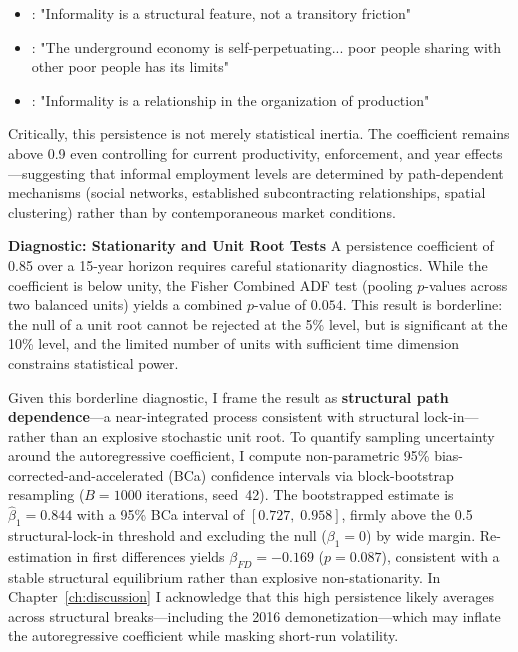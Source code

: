 \begin{itemize}
	\item \textcite{Portes1989}: "Informality is a structural feature, not a transitory friction"
	\item \textcite{Venkatesh2006}: "The underground economy is self-perpetuating... poor people sharing with other poor people has its limits"
	\item \textcite{Fortuna1989}: "Informality is a relationship in the organization of production"
\end{itemize}

Critically, this persistence is not merely statistical inertia. The coefficient remains above 0.9 even controlling for current productivity, enforcement, and year effects—suggesting that informal employment levels are determined by path-dependent mechanisms (social networks, established subcontracting relationships, spatial clustering) rather than by contemporaneous market conditions.

\noindent \textbf{Diagnostic: Stationarity and Unit Root Tests}
A persistence coefficient of 0.85 over a 15-year horizon requires careful stationarity diagnostics. While the coefficient is below unity, the Fisher Combined ADF test (pooling $p$-values across two balanced units) yields a combined $p$-value of $0.054$. This result is borderline: the null of a unit root cannot be rejected at the 5\% level, but is significant at the 10\% level, and the limited number of units with sufficient time dimension constrains statistical power.

Given this borderline diagnostic, I frame the result as \textbf{structural path dependence}—a near-integrated process consistent with structural lock-in—rather than an explosive stochastic unit root. To quantify sampling uncertainty around the autoregressive coefficient, I compute non-parametric 95\% bias-corrected-and-accelerated (BCa) confidence intervals via block-bootstrap resampling ($B=1000$ iterations, seed~42). The bootstrapped estimate is $\hat{\beta}_1 = 0.844$ with a 95\% BCa interval of $[0.727,\; 0.958]$, firmly above the 0.5 structural-lock-in threshold and excluding the null ($\beta_1=0$) by wide margin. Re-estimation in first differences yields $\beta_{FD}=-0.169$ ($p=0.087$), consistent with a stable structural equilibrium rather than explosive non-stationarity. In Chapter~\ref{ch:discussion} I acknowledge that this high persistence likely averages across structural breaks—including the 2016 demonetization—which may inflate the autoregressive coefficient while masking short-run volatility.

